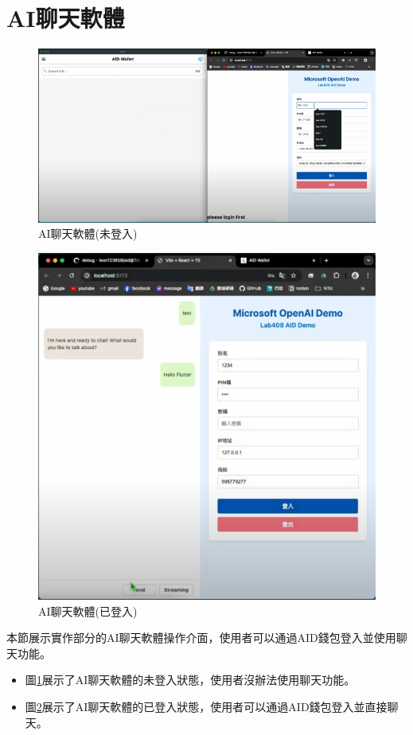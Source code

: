 \section{AI聊天軟體}
\begin{figure}
  \centering
  \includegraphics[width=\linewidth]{figures/AI-demo-logout.png}
  \caption{AI聊天軟體(未登入)}
  \label{fig:appendix-AI-demo-logout}
\end{figure}
\clearpage
\begin{figure}[p]
  \centering
  \includegraphics[width=\linewidth]{figures/AI-demo.png}
  \caption{AI聊天軟體(已登入)}
  \label{fig:appendix-AI-demo}
\end{figure}
本節展示實作部分的AI聊天軟體操作介面，使用者可以通過AID錢包登入並使用聊天功能。
\begin{itemize}
  \item 圖\ref{fig:appendix-AI-demo-logout}展示了AI聊天軟體的未登入狀態，使用者沒辦法使用聊天功能。
  \item 圖\ref{fig:appendix-AI-demo}展示了AI聊天軟體的已登入狀態，使用者可以通過AID錢包登入並直接聊天。
\end{itemize}
